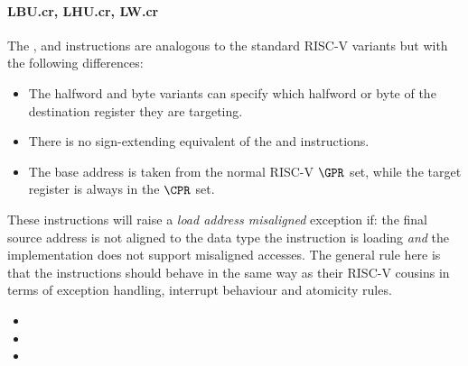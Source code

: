 \paragraph{LBU.cr, LHU.cr, LW.cr}

The ,  and  instructions are analogous to
the standard RISC-V variants but with the following differences:

\begin{itemize}
\item The halfword and byte variants can specify which halfword or byte of
      the destination register they are targeting.
\item There is no sign-extending equivalent of the  and 
      instructions.
\item The base address is taken from the normal RISC-V $\GPR$ set, while the
      target register is always in the $\CPR$ set.
\end{itemize}

These instructions will raise a {\em load address misaligned} exception
if: the final source address is not aligned to the data type the instruction
is loading {\em and} the implementation does not support misaligned accesses.
The general rule here is that the  instructions should behave in
the same way as their RISC-V cousins in terms of exception handling,
interrupt behaviour and atomicity rules.

\begin{itemize}
\item {}
\item {}
\item {}
\end{itemize}


